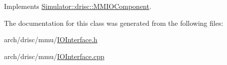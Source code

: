 Implements \hyperlink{class_simulator_1_1drisc_1_1_m_m_i_o_component_aab3662058e7a00109b122a1460188a8b}{Simulator\+::drisc\+::\+M\+M\+I\+O\+Component}.



The documentation for this class was generated from the following files\+:\begin{DoxyCompactItemize}
\item 
arch/drisc/mmu/\hyperlink{_i_o_interface_8h}{I\+O\+Interface.\+h}\item 
arch/drisc/mmu/\hyperlink{_i_o_interface_8cpp}{I\+O\+Interface.\+cpp}\end{DoxyCompactItemize}
